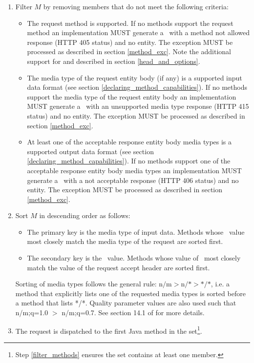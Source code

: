 \begin{enumerate}
\begin{enumerate}
\item \label{filter_methods} Filter $M$ by removing members that do not meet the following criteria:
\begin{itemize}
\item The request method is supported. If no methods support the request method an implementation MUST generate a \WebAppExc\ with a method not allowed response (HTTP 405 status) and no entity. The exception MUST be processed as described in section \ref{method_exc}. Note the additional support for  and  described in section \ref{head_and_options}.
\item The media type of the request entity body (if any) is a supported input data format (see section \ref{declaring_method_capabilities}). If no methods support the media type of the request entity body an implementation MUST generate a \WebAppExc\ with an unsupported media type response (HTTP 415 status) and no entity. The exception MUST be processed as described in section \ref{method_exc}.
\item At least one of the acceptable response entity body media types is a supported output data format (see section \ref{declaring_method_capabilities}). If no methods support one of the acceptable response entity body media types an implementation MUST generate a \WebAppExc\ with a not acceptable response (HTTP 406 status) and no entity. The exception MUST be processed as described in section \ref{method_exc}.
\end{itemize} 
\item Sort $M$ in descending order as follows:
\begin{itemize}
\item The primary key is the media type of input data. Methods whose \Consumes\ value most closely match the media type of the request are sorted first.
\item The secondary key is the \Produces\ value. Methods whose value of \Produces\ most closely match the value of the request accept header are sorted first.
\end{itemize}

Sorting of media types follows the general rule: $\mbox{n/m} > \mbox{n/*} > \mbox{*/*}$, i.e. a method that explicitly lists one of the requested media types is sorted before a method that lists */*. Quality parameter values are also used such that n/m;q=1.0 $>$ n/m;q=0.7. See section 14.1 of \cite{http11} for more details.

\item \label{dispatch_method} The request is dispatched to the first Java method in the set\footnote{Step \ref{filter_methods} ensures the set contains at least one member.}.
\end{enumerate}

\end{enumerate}

